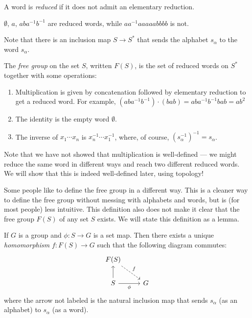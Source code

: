 \documentclass[a4paper]{article}
\begin{document}
\begin{defi}
  A word is \emph{reduced} if it does not admit an elementary reduction.
\end{defi}

\begin{eg}
  $\emptyset$, $a$, $aba^{-1}b^{-1}$ are reduced words, while $aa^{-1}aaaaabbbb$ is not.
\end{eg}
Note that there is an inclusion map $S \to S^*$ that sends the alphabet $s_\alpha$ to the word $s_\alpha$.

\begin{defi}
  The \emph{free group} on the set $S$, written $F(S)$, is the set of reduced words on $S^*$ together with some operations:
  \begin{enumerate}
    \item Multiplication is given by concatenation followed by elementary reduction to get a reduced word. For example, $(aba^{-1}b^{-1}) \cdot (bab) = aba^{-1}b^{-1}bab = ab^2$
    \item The identity is the empty word $\emptyset$.
    \item The inverse of $x_1\cdots x_n$ is $x_n^{-1}\cdots x_1^{-1}$, where, of course, $(s_\alpha^{-1})^{-1} = s_\alpha$.
  \end{enumerate}
\end{defi}
Note that we have not showed that multiplication is well-defined --- we might reduce the same word in different ways and reach two different reduced words. We will show that this is indeed well-defined later, using topology!

Some people like to define the free group in a different way. This is a cleaner way to define the free group without messing with alphabets and words, but is (for most people) less intuitive. This definition also does not make it clear that the free group $F(S)$ of any set $S$ exists. We will state this definition as a lemma.
\begin{lemma}
  If $G$ is a group and $\phi: S\to G$ is a set map. Then there exists a unique \emph{homomorphism} $f: F(S) \to G$ such that the following diagram commutes:
  \[
    \begin{tikzcd}
      F(S) \ar[dr, dashed, "f"] \\
      S \ar[u] \ar[r, "\phi"'] & G
    \end{tikzcd}
  \]
  where the arrow not labeled is the natural inclusion map that sends $s_\alpha$ (as an alphabet) to $s_\alpha$ (as a word).
\end{lemma}
\end{document}
